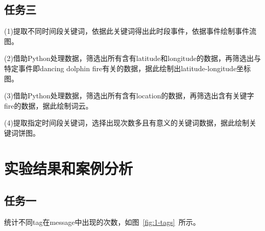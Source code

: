 \documentclass[a4paper]{article}
\begin{document}
\subsection{任务三}
(1)提取不同时间段关键词，依据此关键词得出此时段事件，依据事件绘制事件流图。

(2)借助Python处理数据，筛选出所有含有latitude和longitude的数据，再筛选出与特定事件即dancing dolphin fire有关的数据，据此绘制出latitude-longitude坐标图。

(3)借助Python处理数据，筛选出所有含有location的数据，再筛选出含有关键字fire的数据，据此绘制词云。

(4)提取指定时间段关键词，选择出现次数多且有意义的关键词数据，据此绘制关键词饼图。

\section{实验结果和案例分析}\label{sub:ptxeva}
\subsection{任务一}

统计不同tag在message中出现的次数，如图~\ref{fig:1-tags}~所示。
\end{document}

